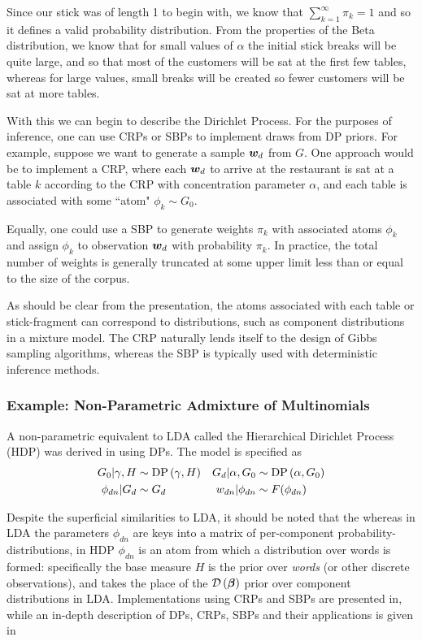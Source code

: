 Since our stick was of length 1 to begin with, we know that $\sum_{k=1}^{\infty} \pi_k = 1$ and so it defines a valid probability distribution. From the properties of the Beta distribution, we know that for small values of $\alpha$ the initial stick breaks will be quite large, and so that most of the customers will be sat at the first few tables, whereas for large values, small breaks will be created so fewer customers will be sat at more tables.

With this we can begin to describe the Dirichlet Process. For the purposes of inference, one can use CRPs or SBPs to implement draws from DP priors. For example, suppose we want to generate a sample ${ \bm w_d }$ from $G$. One approach would be to implement a CRP\cite{Neal2000}, where each ${ \bm w_d }$ to arrive at the restaurant is sat at a table $k$ according to the CRP with concentration parameter $\alpha$, and each table is associated with some ``atom" $\phi_k \sim G_0$.

Equally, one could use a SBP\cite{Sethuraman1994} to generate weights $\pi_k$ with associated atoms $\phi_k$ and assign $\phi_k$ to observation ${ \bm w_d }$ with probability $\pi_k$. In practice, the total number of weights is generally truncated at some upper limit less than or equal to the size of the corpus. 

As should be clear from the presentation, the atoms associated with each table or stick-fragment can correspond to distributions, such as component distributions in a mixture model. The CRP naturally lends itself to the design of Gibbs sampling algorithms, whereas the SBP is typically used with deterministic inference methods. 

\subsubsection*{Example: Non-Parametric Admixture of Multinomials}
A non-parametric equivalent to LDA called the Hierarchical Dirichlet Process (HDP) was derived in \cite{Teh2006b} using DPs. The model is specified as
\begin{align}
G_0 | \gamma, H & \sim \text{DP} \left( {\gamma, H } \right) &
G_d | \alpha, G_0 & \sim \text{DP} \left( {\alpha, G_0} \right) \\
\phi_{dn} |G_d &\sim G_d & w_{dn} | \phi_{dn} & \sim F(\phi_{dn})
\end{align}

Despite the superficial similarities to LDA, it should be noted that the whereas in LDA the parameters $\phi_{dn}$ are keys into a matrix of per-component probability-distributions, in HDP $\phi_{dn}$ is an atom from which a distribution over words is formed: specifically the base measure $H$ is the prior over \emph{words} (or other discrete observations), and takes the place of the $\mathcal{D} \left( {\bm \beta} \right)$ prior over component distributions in LDA. Implementations using CRPs and SBPs are presented in\cite{Teh2006b}, while an in-depth description of DPs, CRPs, SBPs and their applications is given in\cite{JordanMichael2005a}





